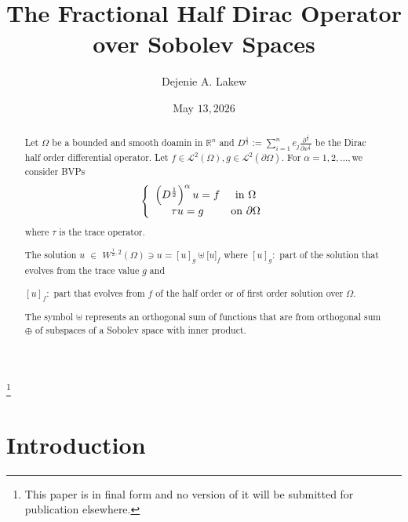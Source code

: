 \documentclass{amsart}%
\providecommand{\U}[1]{\protect\rule{.1in}{.1in}}
\theoremstyle{plain}
\numberwithin{equation}{section}
\begin{document}
\title[The Fractional Half Dirac Operator over Sobolev Spaces]{The Fractional Half Dirac Operator over Sobolev Spaces}
\author{Dejenie A. Lakew}
\address{Hampton University\\
Department of Mathematics}
\thanks{This paper is in final form and no version of it will be submitted for
publication elsewhere.}
\date{May $13,2026$}

\begin{abstract}
Let $\Omega$ be a bounded and smooth doamin in $%
\mathbb{R}
^{n}$ and $D^{\frac{1}{2}}:=%
{\displaystyle\sum\limits_{i=1}^{n}}
e_{j}\frac{\partial^{\frac{1}{2}}}{\partial x^{\frac{1}{2}}}$ be the Dirac
half order differential operator. Let $f\in%
\mathcal{L}%
^{2}\left(  \Omega\right)  ,g\in%
\mathcal{L}%
^{2}\left(  \partial\Omega\right)  $. For $\alpha=1,2,...,$we consider BVPs
\[
\left\{
\begin{array}
[c]{cc}%
\left(  D^{\frac{1}{2}}\right)  ^{\alpha}u=f & \text{in }\Omega\\
\tau u=g & \text{on }\partial\Omega
\end{array}
\right.
\]
where $\tau$ is the trace operator.

The solution $u$ $\in$ $W^{\frac{1}{2},2}\left(  \Omega\right)  \ni
u=[u]_{g}\uplus\lbrack u]_{f}$ where $[u]_{g}:$ part of the solution that
evolves from the trace value $g$ and

$[u]_{f}:$ part that evolves from $f$ of the half order or of first order
solution over $\Omega$.

The symbol $\uplus$ represents an orthogonal sum of functions that are from
orthogonal sum $\oplus$ of subspaces of a Sobolev space with inner product.

\end{abstract}
\maketitle


\section{Introduction}
\end{document}
